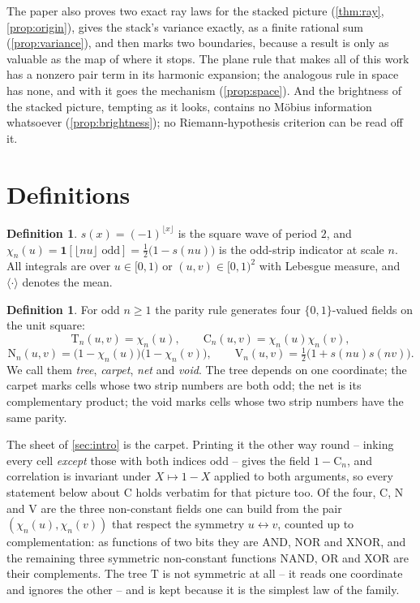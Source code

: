 \documentclass[11pt]{amsart}
\theoremstyle{definition}
\newtheorem{definition}[theorem]{Definition}
\theoremstyle{remark}
\begin{document}
The paper also proves two exact ray laws for the stacked picture (\cref{thm:ray}, \cref{prop:origin}), gives the stack's variance exactly, as a finite rational sum (\cref{prop:variance}), and then marks two boundaries, because a result is only as valuable as the map of where it stops. The plane rule that makes all of this work has a nonzero pair term in its harmonic expansion; the analogous rule in space has none, and with it goes the mechanism (\cref{prop:space}). And the brightness of the stacked picture, tempting as it looks, contains no M\"obius information whatsoever (\cref{prop:brightness}); no Riemann-hypothesis criterion can be read off it.

\section{Definitions}
\label{sec:defs}

\begin{definition}
\label{def:wave}
$s(x)=(-1)^{\lfloor x\rfloor}$ is the square wave of period $2$, and $\chi_n(u)=\mathbf 1[\lfloor nu\rfloor\text{ odd}]=\tfrac12\bigl(1-s(nu)\bigr)$ is the odd-strip indicator at scale $n$. All integrals are over $u\in[0,1)$ or $(u,v)\in[0,1)^2$ with Lebesgue measure, and $\langle\cdot\rangle$ denotes the mean.
\end{definition}

\begin{definition}
\label{def:fields}
For odd $n\ge1$ the parity rule generates four $\{0,1\}$-valued fields on the unit square:
\[
\mathrm{T}_n(u,v)=\chi_n(u),\qquad
\mathrm{C}_n(u,v)=\chi_n(u)\chi_n(v),
\]
\[
\mathrm{N}_n(u,v)=\bigl(1-\chi_n(u)\bigr)\bigl(1-\chi_n(v)\bigr),\qquad
\mathrm{V}_n(u,v)=\tfrac12\bigl(1+s(nu)s(nv)\bigr).
\]
We call them \emph{tree}, \emph{carpet}, \emph{net} and \emph{void}. The tree depends on one coordinate; the carpet marks cells whose two strip numbers are both odd; the net is its complementary product; the void marks cells whose two strip numbers have the same parity.
\end{definition}

The sheet of \cref{sec:intro} is the carpet. Printing it the other way round -- inking every cell \emph{except} those with both indices odd -- gives the field $1-\mathrm{C}_n$, and correlation is invariant under $X\mapsto1-X$ applied to both arguments, so every statement below about $\mathrm{C}$ holds verbatim for that picture too. Of the four, $\mathrm{C}$, $\mathrm{N}$ and $\mathrm{V}$ are the three non-constant fields one can build from the pair $(\chi_n(u),\chi_n(v))$ that respect the symmetry $u\leftrightarrow v$, counted up to complementation: as functions of two bits they are AND, NOR and XNOR, and the remaining three symmetric non-constant functions NAND, OR and XOR are their complements. The tree $\mathrm{T}$ is not symmetric at all -- it reads one coordinate and ignores the other -- and is kept because it is the simplest law of the family.
\end{document}
